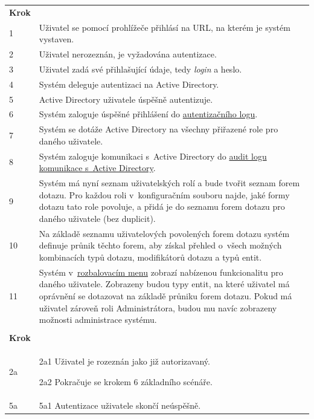 \documentclass[thesis=M,czech]{FITthesis}[2019/12/23]
\begin{document}
	\begin{longtable}{|p{}|p{}|}
		\rowcolor{Gray}\multicolumn{2}{|l|}{\textbf{Základní scénář}} \\ \hline
		\textbf{Krok} & \\ \hline
		1 & Uživatel se pomocí prohlížeče přihlásí na URL, na kterém je systém vystaven. \\ \hline
		2 & Uživatel nerozeznán, je vyžadována autentizace. \\ \hline
		3 & Uživatel zadá své přihlašující údaje, tedy \textit{login} a heslo. \\ \hline
		4 & Systém deleguje autentizaci na Active Directory. \\ \hline
		5 & Active Directory uživatele úspěšně autentizuje. \\ \hline
		6 & Systém zaloguje úspěšné přihlášení do \hyperref[Logy]{autentizačního logu}. \\ \hline
		7 & Systém se dotáže Active Directory na všechny přiřazené role pro daného uživatele. \\ \hline
		8 & Systém zaloguje komunikaci s~Active Directory do \hyperref[Logy]{audit logu komunikace s~Active Directory}. \\ \hline
		9 & Systém má nyní seznam uživatelských rolí a bude tvořit seznam forem dotazu. Pro každou roli v~konfiguračním souboru najde, jaké formy dotazu tato role povoluje, a přidá je do seznamu forem dotazu pro daného uživatele (bez duplicit). \\ \hline
		10 & Na základě seznamu uživatelových povolených forem dotazu systém definuje průnik těchto forem, aby získal přehled o~všech možných kombinacích typů dotazu, modifikátorů dotazu a typů entit. \\ \hline
		11 & Systém v~\hyperref[RozbalovaciMenu]{rozbalovacím menu} zobrazí nabízenou funkcionalitu pro daného uživatele. Zobrazeny budou typy entit, na které uživatel má oprávnění se dotazovat na základě průniku forem dotazu.
Pokud má uživatel zároveň roli Administrátora, budou mu navíc zobrazeny možnosti administrace systému. \\ \hline
		\rowcolor{Gray}\multicolumn{2}{|l|}{\textbf{Alternativní scénáře}} \\ \hline
		\textbf{Krok} & \\ \hline
		2a &
		2a1 Uživatel je rozeznán jako již autorizavaný.
		
  		2a2 Pokračuje se krokem 6 základního scénáře. \\ \hline
  		5a &
		5a1 Autentizace uživatele skončí neúspěšně.
		

\end{longtable}
\end{document}
